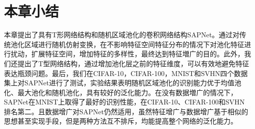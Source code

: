 \section{本章小结}
\label{sec:sap:conclude}


本章提出了具有T形网络结构和随机区域池化的卷积网络结构SAPNet。通过对传统池化区域进行随机仿射变换，在不影响特征空间特征分布的情况下对池化特征进行扰动，扩展特征空间，增加特征的多样性，最终达到特征増广的目的。此外，我们还提出了T型网络结构，通过增加池化层之前的特征维度，可以有效地避免特征表达瓶颈问题。最后，我们在CIFAR-10，CIFAR-100，MNIST和SVHN四个数据集上对SAPNet进行了测试，实验结果表明随机区域池化的识别能力优于均值池化、最大池化和随机池化，具有较好的泛化能力。在没有数据増广的情况下，SAPNet在MNIST上取得了最好的识别性能，在CIFAR-10、CIFAR-100和SVHN排名第二。且数据增广对SAPNet仍然适用，虽然特征增广与数据增广基于相似的思想甚至实现手段，但是两种方法互不排斥，均能提高整个网络的泛化能力。














